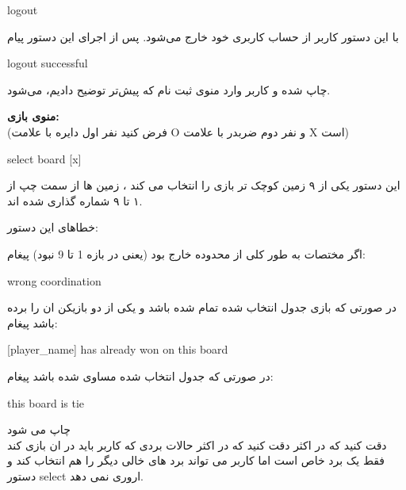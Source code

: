 \documentclass[]{article}
\begin{document}
\hrulefill




\begin{tcolorbox}[boxrule=0pt]
	\begin{latin}
  	  \large{
  	  	logout
		}
	\end{latin}
\end{tcolorbox}

با این دستور کاربر از حساب کاربری خود خارج می‌شود. پس از اجرای این دستور پیام


\begin{tcolorbox}[boxrule=0pt]
	\begin{latin}
  	  \large{
  	  	logout successful
		}
	\end{latin}
\end{tcolorbox}

چاپ شده و کاربر وارد منوی ثبت نام که پیش‌تر توضیح دادیم، می‌شود.

\newpage
\textbf{منوی بازی:}
\\(فرض کنید نفر اول دایره با علامت O و نفر دوم ضربدر با علامت X است)

\begin{tcolorbox}[boxrule=0pt]
	\begin{latin}
  	  \large{
  	  	select board [x]
		}
	\end{latin}
\end{tcolorbox}

این دستور یکی از ۹ زمین کوچک تر بازی را انتخاب می کند ، زمین ها از سمت چپ از ۱ تا ۹ شماره گذاری شده اند.


 خطاهای این دستور:

 اگر مختصات به طور کلی از محدوده خارج بود (یعنی در بازه 1 تا 9 نبود) پیغام:
\begin{tcolorbox}[boxrule=0pt]
	\begin{latin}
  	  \large{
  	  	wrong coordination
		}
	\end{latin}
\end{tcolorbox}
در صورتی که بازی جدول انتخاب شده تمام شده باشد و یکی از دو بازیکن ان را برده باشد پیغام:
\begin{tcolorbox}[boxrule=0pt]
	\begin{latin}
  	  \large{
  	  	[player\_name] has already won on this board
		}
	\end{latin}
\end{tcolorbox}
در صورتی که جدول انتخاب شده مساوی شده باشد پیغام:
\begin{tcolorbox}[boxrule=0pt]
	\begin{latin}
  	  \large{
  	  	this board is tie
		}
	\end{latin}
\end{tcolorbox}
چاپ می شود\\
دقت کنید که در اکثر  دقت کنید که در اکثر حالات بردی که کاربر باید در ان بازی کند فقط یک برد خاص است اما 
کاربر می تواند برد های خالی دیگر را هم انتخاب کند و دستور select اروری نمی دهد.
\end{document}

